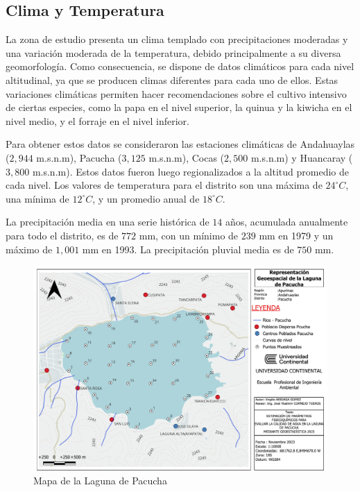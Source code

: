 \subsection{Clima y Temperatura}

La zona de estudio presenta un clima templado con precipitaciones moderadas y una variación moderada de la temperatura, debido principalmente a su diversa geomorfología. Como consecuencia, se dispone de datos climáticos para cada nivel altitudinal, ya que se producen climas diferentes para cada uno de ellos. Estas variaciones climáticas permiten hacer recomendaciones sobre el cultivo intensivo de ciertas especies, como la papa en el nivel superior, la quinua y la kiwicha en el nivel medio, y el forraje en el nivel inferior.

Para obtener estos datos se consideraron las estaciones climáticas de Andahuaylas (\(2,944\) m.s.n.m), Pacucha (\(3,125\) m.s.n.m), Cocas (\(2,500\) m.s.n.m) y Huancaray (\(3,800\) m.s.n.m). Estos datos fueron luego regionalizados a la altitud promedio de cada nivel. Los valores de temperatura para el distrito son una máxima de \(24^{\circ}C\), una mínima de \(12^{\circ}C\), y un promedio anual de \(18^{\circ}C\).


La precipitación media en una serie histórica de \(14\) años, acumulada anualmente para todo el distrito, es de \(772\) mm, con un mínimo de \(239\) mm en 1979 y un máximo de \(1,001\) mm en 1993. La precipitación pluvial media es de \(750\) mm.

\newpage %
\begin{landscape} %
    \thispagestyle{empty} %
    
    
    \begin{figure}[htbp!]
        \centering
        \includegraphics[width=0.9\linewidth]{Capitulos/GEOESTADICTICA_PACUCHA.pdf} 
        \caption{Mapa de la Laguna de Pacucha} %
    \end{figure}
\end{landscape}


